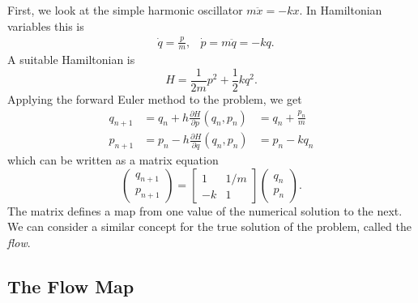 First, we look at the simple harmonic oscillator $m \ddot{x} = -k x$.
In Hamiltonian variables this is
\begin{equation*}
	\begin{aligned}
		&\dot{q} = \frac{p}{m}, &\dot{p} = m\ddot{q} = -kq.
	\end{aligned}
\end{equation*}
A suitable Hamiltonian is
\begin{equation*}
	H = \frac{1}{2m}p^2 + \frac{1}{2}kq^2.
\end{equation*}
Applying the forward Euler method to the problem, we get
\begin{equation*}
	\begin{aligned}
		q_{n+1} &= q_n + h\frac{\partial H}{\partial p}(q_n, p_n) &= q_n + \frac{p_n}{m}\\
		p_{n+1} &= p_n - h\frac{\partial H}{\partial q}(q_n, p_n) &= p_n - kq_n
	\end{aligned}
\end{equation*}
which can be written as a matrix equation
\begin{equation*}
	\begin{pmatrix}
		q_{n+1} \\
		p_{n+1}
	\end{pmatrix} = \begin{bmatrix}
		1 & 1/m \\
		-k & 1
	\end{bmatrix} \begin{pmatrix}
		q_n \\
		p_n
	\end{pmatrix}.
\end{equation*}
The matrix defines a map from one value of the numerical solution to the next.
We can consider a similar concept for the true solution of the problem, called the \textit{flow}.

\subsection{The Flow Map}

